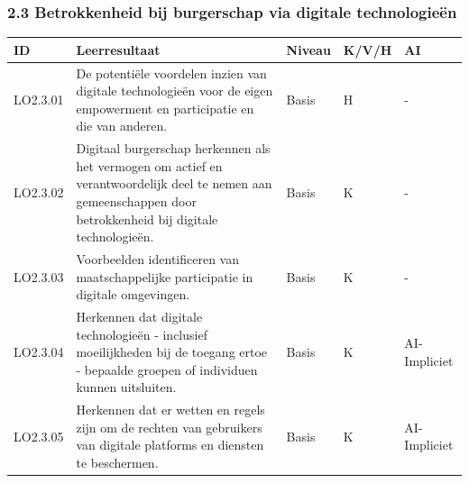 \documentclass[
  dutch,
  letterpaper,
  DIV=11,
  numbers=noendperiod]{scrartcl}
\begin{document}
\subsubsection{2.3 Betrokkenheid bij burgerschap via digitale
technologieën}\label{betrokkenheid-bij-burgerschap-via-digitale-technologieuxebn}

\begin{longtable}[]{@{}
  >{\centering\arraybackslash}p{}
  >{\centering\arraybackslash}p{}
  >{\centering\arraybackslash}p{}
  >{\centering\arraybackslash}p{}
  >{\centering\arraybackslash}p{}@{}}
\toprule\noalign{}
\begin{minipage}[b]{\linewidth}\centering
ID
\end{minipage} & \begin{minipage}[b]{\linewidth}\centering
Leerresultaat
\end{minipage} & \begin{minipage}[b]{\linewidth}\centering
Niveau
\end{minipage} & \begin{minipage}[b]{\linewidth}\centering
K/V/H
\end{minipage} & \begin{minipage}[b]{\linewidth}\centering
AI
\end{minipage} \\
\midrule\noalign{}
\endhead
\bottomrule\noalign{}
\endlastfoot
LO2.3.01 & De potentiële voordelen inzien van digitale technologieën
voor de eigen empowerment en participatie en die van anderen. & Basis &
H & - \\
LO2.3.02 & Digitaal burgerschap herkennen als het vermogen om actief en
verantwoordelijk deel te nemen aan gemeenschappen door betrokkenheid bij
digitale technologieën. & Basis & K & - \\
LO2.3.03 & Voorbeelden identificeren van maatschappelijke participatie
in digitale omgevingen. & Basis & K & - \\
LO2.3.04 & Herkennen dat digitale technologieën - inclusief
moeilijkheden bij de toegang ertoe - bepaalde groepen of individuen
kunnen uitsluiten. & Basis & K & AI-Impliciet \\
LO2.3.05 & Herkennen dat er wetten en regels zijn om de rechten van
gebruikers van digitale platforms en diensten te beschermen. & Basis & K
& AI-Impliciet \\

\end{longtable}
\end{document}
